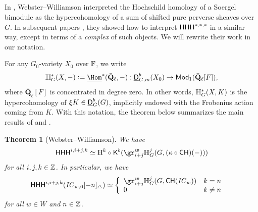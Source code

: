 \documentclass[a4paper,10pt,leqno]{amsart}
\theoremstyle{plain}
\theoremstyle{plain}
\newtheorem{thm}{Theorem}[subsection]
\theoremstyle{plain}
\theoremstyle{definition}
\theoremstyle{remark}
\newcommand{\IC}{\mathit{IC}}
\newcommand{\Mod}{\mathsf{Mod}}
\newcommand{\QL}{\bar{\mathbf{Q}}_\ell}
\begin{document}
\subsection{}

In \cite{ww_2008}, Webster--Williamson interpreted the Hochschild homology of a Soergel bimodule as the hypercohomology of a sum of shifted pure perverse sheaves over $G$.
In subsequent papers \cite{ww_2011, ww_2017}, they showed how to interpret $\sf{HHH}^{\ast, \ast, \ast}$ in a similar way, except in terms of a \emph{complex} of such objects.
We will rewrite their work in our notation.

For any $G_0$-variety $X_0$ over $\bb{F}$, we write 
\begin{align}
\bb{H}_G^\ast(X, -) \vcentcolon= \SHom^\ast(\QL, -) : \underline{\sf{D}}_{G, m}^b(X_0) \to \Mod_1(\QL[F]),
\end{align}
where $\QL[F]$ is concentrated in degree zero.
In other words, $\bb{H}_G^\ast(X, K)$ is the hypercohomology of $\xi K \in \underline{\sf{D}}_G^b(G)$, implicitly endowed with the Frobenius action coming from $K$.
With this notation, the theorem below summarizes the main results of \cite{ww_2008} and \cite{ww_2017}.

\begin{thm}[Webster--Williamson]\label{thm:ww}
We have
\begin{align}\begin{split}
\sf{HHH}^{i, i + j, k}
\simeq 
	\ur{H}^k \circ \sf{K}^b(\gr_{i + j}^{\bm{w}} \bb{H}_G^j(G, (\kappa \circ \sf{CH})(-)))
\end{split}\end{align}
for all $i, j, k \in \bb{Z}$.
In particular, we have
\begin{align}
\sf{HHH}^{i, i + j, k}(\IC_{w, 0}[-n]_\triangle)
&\simeq	\left\{\begin{array}{ll}
\gr_{i + j}^{\bm{w}} \bb{H}_G^j(G, \sf{CH}(\IC_w)) &k = n\\
0	&k \neq n
\end{array}\right.
\end{align}
for all $w \in W$ and $n \in \bb{Z}$.
\end{thm}
\end{document}
